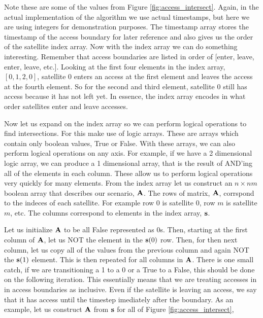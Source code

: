 Note these are some of the values from Figure \ref{fig:access_intersect}.
Again, in the actual implementation of the algorithm we use actual timestamps,
but here we are using integers for demonstration purposes. The timestamp array
stores the timestamp of the access boundary for later reference and also gives
us the order of the satellite index array. Now with the index array we can do
something interesting. Remember that access boundaries are listed in order of
[enter, leave, enter, leave, etc.]. Looking at the first four elements in the
index array, $[0, 1, 2, 0]$, satellite 0 enters an access at the first element
and leaves the access at the fourth element. So for the second and third
element, satellite 0 still has access because it has not left yet. In essence,
the index array encodes in what order satellites enter and leave accesses. 

Now let us expand on the index array so we can perform logical operations to
find intersections. For this make use of logic arrays.  These are arrays which
contain only boolean values, True or False. With these arrays, we can also
perform logical operations on any axis. For example, if we have a 2 dimensional
logic array, we can produce a 1 dimensional array, that is the result of
AND'ing all of the elements in each column. These allow us to perform logical
operations very quickly for many elements. From the index array let us
construct an $n\times nm$ boolean array that describes our scenario, $\bm{\mathrm{A}}$.
The rows of matrix, $\bm{\mathrm{A}}$, corrspond to the indeces of each satellite.  For
example row 0 is satellite 0, row $m$ is satellite $m$, etc. The columns
correspond to elements in the index array, $\bm{\mathrm{s}}$.

Let us initialize $\bm{\mathrm{A}}$ to be all False represented as 0s. Then, starting at
the first column of $\bm{\mathrm{A}}$, let us NOT the element in the $\bm{\mathrm{s}}(0)$ row.
Then, for then next column, let us copy all of the values from the previous
column and again NOT the $\bm{\mathrm{s}}(1)$ element. This is then repeated for all
columns in $\bm{\mathrm{A}}$. There is one small catch, if we are transitioning a 1 to a
0 or a True to a False, this should be done on the following iteration. This
essentially means that we are treating accesses in in access boundaries as
inclusive. Even if the satellite is leaving an access, we say that it has
access until the timestep imediately after the boundary. As an example, let us
construct $\bm{\mathrm{A}}$ from $\bm{\mathrm{s}}$ for all of Figure \ref{fig:access_intersect},

